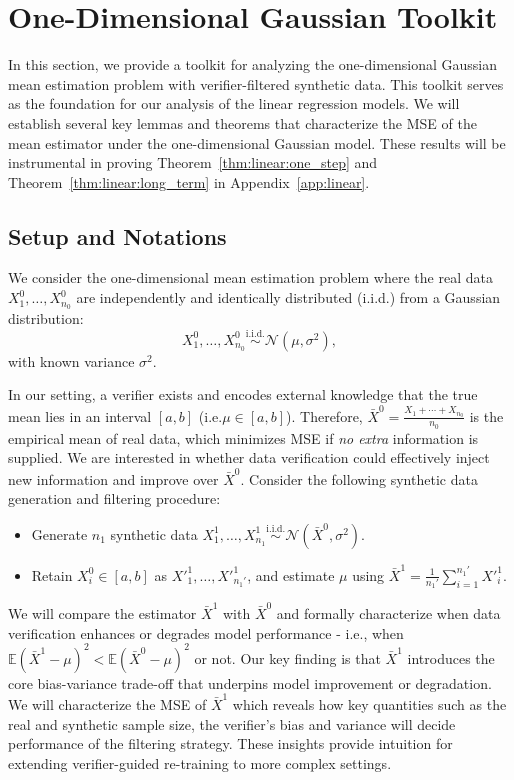 
\section{One-Dimensional Gaussian Toolkit}\label{app:gaussian}
In this section, we provide a toolkit for analyzing the one-dimensional Gaussian mean estimation problem with verifier-filtered synthetic data.
This toolkit serves as the foundation for our analysis of the linear regression models.
We will establish several key lemmas and theorems that characterize the MSE of the mean estimator under the one-dimensional Gaussian model.
These results will be instrumental in proving Theorem~\ref{thm:linear:one_step} and Theorem~\ref{thm:linear:long_term} in Appendix~\ref{app:linear}.
\subsection{Setup and Notations}
We consider the one-dimensional mean estimation problem where the real data \( X^0_1, \dots, X^0_{n_0} \) are independently and identically distributed (i.i.d.) from a Gaussian distribution:
\[
X^0_1, \dots, X^0_{n_0} \overset{\text{i.i.d.}}{\sim} \mathcal{N}(\mu, \sigma^2),
\]
with known variance \( \sigma^2 \).

In our setting, a verifier exists and encodes external knowledge that the true mean lies in an interval $[a,b]$ (i.e.\( \mu \in [a, b]\)). 
Therefore, $\bar{X}^{0} = \frac{X_1 + \cdots + X_{n_0}}{n_0}$ is the empirical mean of real data, which minimizes MSE if \emph{no extra} information is supplied.
We are interested in whether data verification could effectively inject new information and improve over $\bar{X}^{0}$.
Consider the following synthetic data generation and filtering procedure:
\begin{itemize}
     \item Generate $n_1$ synthetic data \(X^1_1, \dots, X^1_{n_1} \overset{\text{i.i.d.}}{\sim} \mathcal{N}(\bar{X}^{0}, \sigma^2)\).
     \item Retain \(X^0_i \in [a, b]\) as \(X'^1_1, \dots, X'^1_{n_1'}\), and estimate \(\mu\) using $\bar{X}^{1} = \frac{1}{n_1'} \sum_{i=1}^{n_1'} X'^1_i.$
\end{itemize}

We will compare the estimator $\bar{X}^{1}$ with $\bar{X}^{0}$ and formally characterize when data verification enhances or degrades model performance - i.e., when $\mathbb{E}(\bar{X}^{1}-\mu)^2 < \mathbb{E}(\bar{X}^{0}-\mu)^2$ or not.
Our key finding is that $\bar{X}^{1}$ introduces the core bias-variance trade-off that underpins model improvement or degradation.
We will characterize the MSE of $\bar{X}^1$ which reveals how key quantities such as the real and synthetic sample size, the verifier's bias and variance will decide performance of the filtering strategy.
These insights provide intuition for extending verifier-guided re-training to more complex settings.


